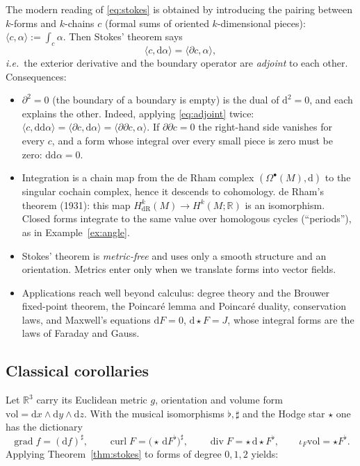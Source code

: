\documentclass[11pt,a4paper]{article}
\newcounter{thm}[section]
\numberwithin{equation}{section}
\theoremstyle{definition}
\theoremstyle{plain}
\newcommand{\R}{\mathbb{R}}
\newcommand{\dd}{\mathrm{d}}
\newcommand{\vol}{\mathrm{vol}}
\newcommand{\ie}{\emph{i.e.}\ }
\newcommand{\hodge}{\star}
\begin{document}
The modern reading of \eqref{eq:stokes} is obtained by introducing the pairing between $k$-forms and $k$-chains $c$ (formal sums of oriented $k$-dimensional pieces): $\langle c,\alpha\rangle:=\int_c\alpha$. Then Stokes' theorem says
\begin{equation}\label{eq:adjoint}
\langle c,\dd\alpha\rangle=\langle\partial c,\alpha\rangle,
\end{equation}
\ie the exterior derivative and the boundary operator are \emph{adjoint} to each other. Consequences:
\begin{itemize}
\item $\partial^2=0$ (the boundary of a boundary is empty) is the dual of $\dd^2=0$, and each explains the other. Indeed, applying \eqref{eq:adjoint} twice: $\langle c,\dd\dd\alpha\rangle=\langle\partial c,\dd\alpha\rangle=\langle\partial\partial c,\alpha\rangle$. If $\partial\partial c=0$ the right-hand side vanishes for every $c$, and a form whose integral over every small piece is zero must be zero: $\dd\dd\alpha=0$.
\item Integration is a chain map from the de Rham complex $(\Omega^\bullet(M),\dd)$ to the singular cochain complex, hence it descends to cohomology. de Rham's theorem (1931): this map $H^k_{\mathrm{dR}}(M)\to H^k(M;\R)$ is an isomorphism. Closed forms integrate to the same value over homologous cycles (``periods''), as in Example~\ref{ex:angle}.
\item Stokes' theorem is \emph{metric-free} and uses only a smooth structure and an orientation. Metrics enter only when we translate forms into vector fields.
\item Applications reach well beyond calculus: degree theory and the Brouwer fixed-point theorem, the Poincar\'e lemma and Poincar\'e duality, conservation laws, and Maxwell's equations $\dd F=0$, $\dd\hodge F=J$, whose integral forms are the laws of Faraday and Gauss.
\end{itemize}

\subsection{Classical corollaries}\label{sec:classical}

Let $\R^3$ carry its Euclidean metric $g$, orientation and volume form $\vol=\dd x\wedge\dd y\wedge\dd z$. With the musical isomorphisms $\flat,\sharp$ and the Hodge star $\hodge$ one has the dictionary
\[
\operatorname{grad}f=(\dd f)^\sharp,\qquad
\operatorname{curl}F=\bigl(\hodge\,\dd F^\flat\bigr)^\sharp,\qquad
\operatorname{div}F=\hodge\,\dd\hodge F^\flat,\qquad
\iota_F\vol=\hodge F^\flat .
\]
Applying Theorem~\ref{thm:stokes} to forms of degree $0,1,2$ yields:
\end{document}
